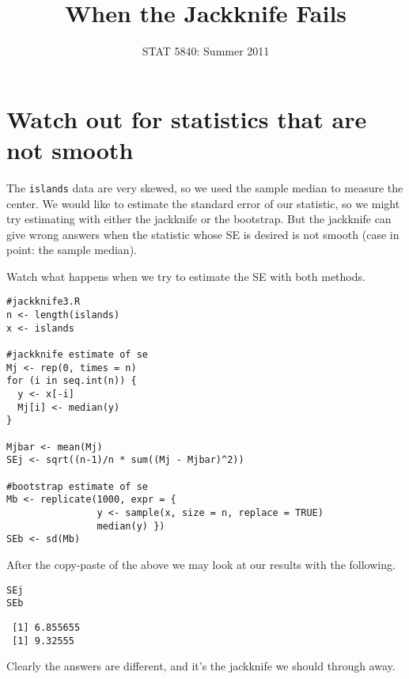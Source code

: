 \documentclass[11pt,english]{article}
\title{When the Jackknife Fails}
\date{STAT 5840: Summer 2011}
\begin{document}
\maketitle

\thispagestyle{empty}

\section*{Watch out for statistics that are not smooth}
\label{sec-1}

The \texttt{islands} data are very skewed, so we used the sample median to measure the center.  We would like to estimate the standard error of our statistic, so we might try estimating with either the jackknife or the bootstrap.  But the jackknife can give wrong answers when the statistic whose SE is desired is not smooth (case in point: the sample median).

Watch what happens when we try to estimate the SE with both methods.

\begin{verbatim}
#jackknife3.R
n <- length(islands)
x <- islands

#jackknife estimate of se
Mj <- rep(0, times = n)
for (i in seq.int(n)) {  
  y <- x[-i]
  Mj[i] <- median(y)
}

Mjbar <- mean(Mj)
SEj <- sqrt((n-1)/n * sum((Mj - Mjbar)^2))

#bootstrap estimate of se
Mb <- replicate(1000, expr = {
                y <- sample(x, size = n, replace = TRUE)
                median(y) })
SEb <- sd(Mb)
\end{verbatim}






After the copy-paste of the above we may look at our results with the following.

\begin{verbatim}
SEj
SEb
\end{verbatim}




\begin{verbatim}
 [1] 6.855655
 [1] 9.32555
\end{verbatim}


Clearly the answers are different, and it's the jackknife we should through away.
\end{document}
